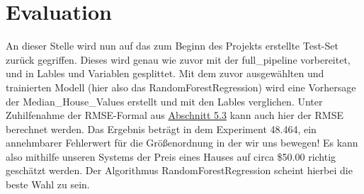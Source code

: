 \section{Evaluation}
\label{evaluation}
An dieser Stelle wird nun auf das zum Beginn des Projekts erstellte Test-Set zurück gegriffen. Dieses wird genau wie zuvor mit der full\_pipeline vorbereitet, und in Lables und Variablen gesplittet. Mit dem zuvor ausgewählten und trainierten Modell (hier also das RandomForestRegression) wird eine Vorhersage der Median\_House\_Values erstellt und mit den Lables verglichen. Unter Zuhilfenahme der RMSE-Formal aus \hyperlink{datensatz}{Abschnitt 5.3} kann auch hier der RMSE berechnet werden. Das Ergebnis beträgt in dem Experiment 48.464, ein annehmbarer Fehlerwert für die Größenordnung in der wir uns bewegen! Es kann also mithilfe unseren Systems der Preis eines Hauses auf circa \$50.00 richtig geschätzt werden. 
Der Algorithmus RandomForestRegression scheint hierbei die beste Wahl zu sein.


